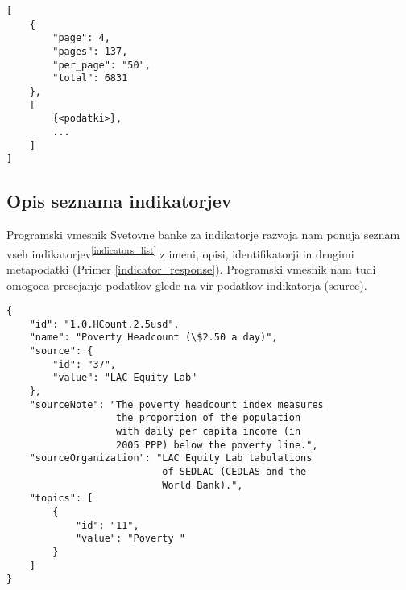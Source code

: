\begin{snippet}
\begin{center}
\begin{lstlisting}
[
    {
    	"page": 4,
		"pages": 137,
		"per_page": "50",
		"total": 6831
    },
    [
        {<podatki>},
        ...
    ]
]
\end{lstlisting}
\end{center}
\caption{Osnovna oblika odgovora programskega vmesnika Svetovne banke, ob veljavni poizvedbi. Prvi element opisuje kolicino dobljenih in vseh 
podatkov, drugi element pa vsebuje s stranjo in stevilom podatkov na stran 
doloceni izsek celotnih podatkov.}
\label{basic_response}
\end{snippet} 



\subsection{Opis seznama indikatorjev}

Programski vmesnik Svetovne banke za indikatorje razvoja nam ponuja seznam 
vseh indikatorjev\textsuperscript{\ref{indicators_list}} z imeni, opisi, 
identifikatorji in drugimi metapodatki (Primer \ref{indicator_response}).
Programski vmesnik nam tudi omogoca presejanje podatkov glede na vir podatkov
indikatorja (source).

\begin{snippet}
\begin{center}
\begin{lstlisting}
{
    "id": "1.0.HCount.2.5usd",
    "name": "Poverty Headcount (\$2.50 a day)",
    "source": {
        "id": "37",
        "value": "LAC Equity Lab"
    },
    "sourceNote": "The poverty headcount index measures 
                   the proportion of the population
                   with daily per capita income (in 
                   2005 PPP) below the poverty line.",
    "sourceOrganization": "LAC Equity Lab tabulations
                           of SEDLAC (CEDLAS and the
                           World Bank).",
    "topics": [
        {
            "id": "11",
            "value": "Poverty "
        }
    ]
}
\end{lstlisting}
\end{center}
\caption{Podatki indikatorja stopnja revscine pri dohodku 2,5 dolarja na dan.}
\label{indicator_response}
\end{snippet} 

